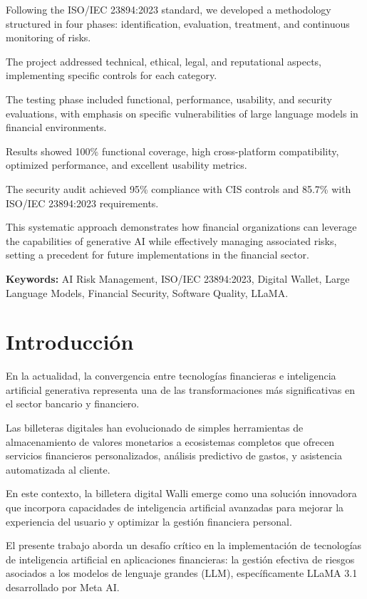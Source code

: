 \documentclass[12pt]{article}
\begin{document}
Following the ISO/IEC 23894:2023 standard, we developed a methodology structured in four phases: identification, evaluation, treatment, and continuous monitoring of risks. 

The project addressed technical, ethical, legal, and reputational aspects, implementing specific controls for each category. 

The testing phase included functional, performance, usability, and security evaluations, with emphasis on specific vulnerabilities of large language models in financial environments. 

Results showed 100\% functional coverage, high cross-platform compatibility, optimized performance, and excellent usability metrics. 

The security audit achieved 95\% compliance with CIS controls and 85.7\% with ISO/IEC 23894:2023 requirements. 

This systematic approach demonstrates how financial organizations can leverage the capabilities of generative AI while effectively managing associated risks, setting a precedent for future implementations in the financial sector.

\textbf{Keywords:} AI Risk Management, ISO/IEC 23894:2023, Digital Wallet, Large Language Models, Financial Security, Software Quality, LLaMA.

\section{Introducción}
\label{sec:introduccion}

En la actualidad, la convergencia entre tecnologías financieras e inteligencia artificial generativa representa una de las transformaciones más significativas en el sector bancario y financiero. 

Las billeteras digitales han evolucionado de simples herramientas de almacenamiento de valores monetarios a ecosistemas completos que ofrecen servicios financieros personalizados, análisis predictivo de gastos, y asistencia automatizada al cliente. 

En este contexto, la billetera digital Walli emerge como una solución innovadora que incorpora capacidades de inteligencia artificial avanzadas para mejorar la experiencia del usuario y optimizar la gestión financiera personal.

El presente trabajo aborda un desafío crítico en la implementación de tecnologías de inteligencia artificial en aplicaciones financieras: la gestión efectiva de riesgos asociados a los modelos de lenguaje grandes (LLM), específicamente LLaMA 3.1 desarrollado por Meta AI. 
\end{document}
